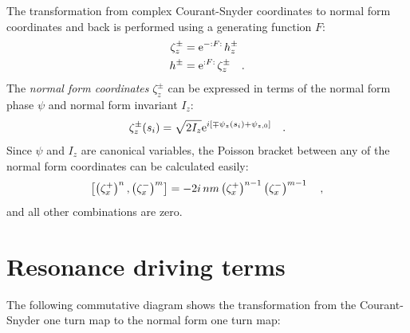 The transformation from complex Courant-Snyder coordinates to normal form coordinates and back is performed
using a generating function $F$:
%
\begin{align}
    \zeta_z^\pm &= \text{e}^{-{:}F{:}\,} h_z^\pm 
    \label{eq_z_from_h} \\
    h^\pm &= \text{e}^{{:}F{:}\,} \zeta_z^\pm
    \label{eq_h_from_z}
    \quad .
\end{align}
%
The \emph{normal form coordinates} $\zeta_z^\pm$
can be expressed in terms of the normal form phase $\psi$ and normal form invariant $I_z$:
%
\begin{equation}
    \zeta_z^\pm(s_i) = \sqrt{2I_z}\text{e}^{i\left[\mp \psi_z(s_i) + \psi_{z,0} \right]}
    \quad .
\end{equation}
%
Since $\psi$ and $I_z$ are canonical variables, the Poisson bracket between any of the normal form
coordinates can be calculated easily:
%
\begin{equation}
    \left[ \left(\zeta_x^+\right)^{n}, \left(\zeta_x^-\right)^{m}\right] = -2i\,nm\left(\zeta_x^+\right)^{n-1}\left(\zeta_x^-\right)^{m-1}
    \quad ,
    \label{eq_poiss_br_ident}
\end{equation}
and all other combinations are zero.
%

\section{Resonance driving terms}
\label{sec_rdts}

The following commutative diagram shows the transformation from the Courant-Snyder one turn map to 
the normal form one turn map:

